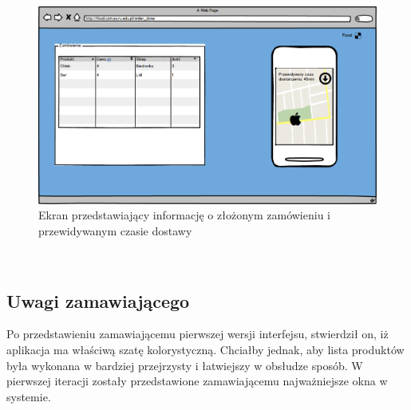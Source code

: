 \begin{figure}[H]
\centering
\includegraphics[width=15cm]{pictures/Zamowienie_zlozone_v1.png}
\caption{Ekran przedstawiający informację o złożonym zamówieniu i przewidywanym czasie dostawy}
\end{figure}

\subsection{Uwagi zamawiającego}
Po przedstawieniu zamawiającemu pierwszej wersji interfejsu, stwierdził on, iż aplikacja ma właściwą szatę kolorystyczną. Chciałby jednak, aby lista produktów była wykonana w bardziej przejrzysty i łatwiejszy w obsłudze sposób. W pierwszej iteracji zostały przedstawione zamawiającemu najważniejsze okna w systemie.
